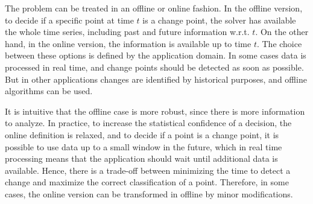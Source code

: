 The problem can be treated in an offline or online fashion.
In the offline version, to decide if a
specific point at time $t$ is a change point, the solver has available the
whole time series, including past and future information w.r.t. $t$. On the
other hand, in the online version, the information is available up to time $t$.
The choice between these options is defined by the application domain. In some
cases data is processed in real time, and change points should be detected as
soon as possible. But in other applications changes are identified by historical
purposes, and offline algorithms can be used.

It is intuitive that the offline case is more robust, since there is more
information to analyze. In practice, to increase the statistical confidence of
a decision, the online definition is relaxed, and to decide if a point
is a change point, it is possible to use data up to a small window in the future,
which in real time processing means that the application should wait until
additional data is available. Hence, there is a trade-off between minimizing
the time to detect a change and maximize the correct classification of a point.
Therefore, in some cases, the online version can be transformed in offline
by minor modifications.

